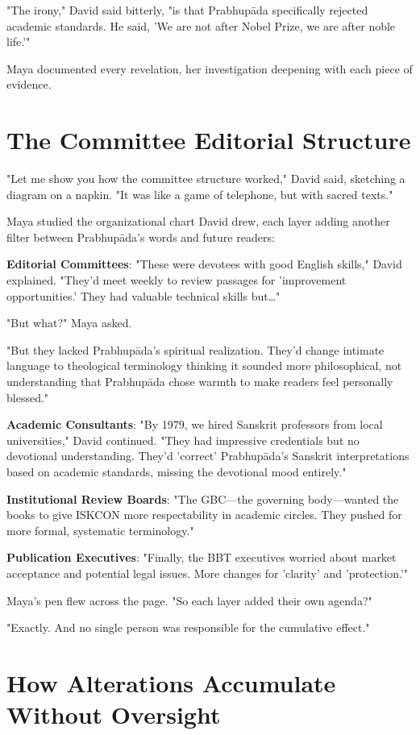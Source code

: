 \documentclass[11pt,twoside]{book}
\begin{document}
"The irony," David said bitterly, "is that Prabhupāda specifically rejected academic standards. He said, 'We are not after Nobel Prize, we are after noble life.'"

Maya documented every revelation, her investigation deepening with each piece of evidence.
\section*{The Committee Editorial Structure}
\label{sec:org6e98596}

"Let me show you how the committee structure worked," David said, sketching a diagram on a napkin. "It was like a game of telephone, but with sacred texts."

Maya studied the organizational chart David drew, each layer adding another filter between Prabhupāda's words and future readers:

\textbf{\textbf{Editorial Committees}}: "These were devotees with good English skills," David explained. "They'd meet weekly to review passages for 'improvement opportunities.' They had valuable technical skills but\ldots{}"

"But what?" Maya asked.

"But they lacked Prabhupāda's spiritual realization. They'd change intimate language to theological terminology thinking it sounded more philosophical, not understanding that Prabhupāda chose warmth to make readers feel personally blessed."

\textbf{\textbf{Academic Consultants}}: "By 1979, we hired Sanskrit professors from local universities," David continued. "They had impressive credentials but no devotional understanding. They'd 'correct' Prabhupāda's Sanskrit interpretations based on academic standards, missing the devotional mood entirely."

\textbf{\textbf{Institutional Review Boards}}: "The GBC—the governing body—wanted the books to give ISKCON more respectability in academic circles. They pushed for more formal, systematic terminology."

\textbf{\textbf{Publication Executives}}: "Finally, the BBT executives worried about market acceptance and potential legal issues. More changes for 'clarity' and 'protection.'"

Maya's pen flew across the page. "So each layer added their own agenda?"

"Exactly. And no single person was responsible for the cumulative effect."
\section*{How Alterations Accumulate Without Oversight}
\label{sec:org0faf7ec}
\end{document}
